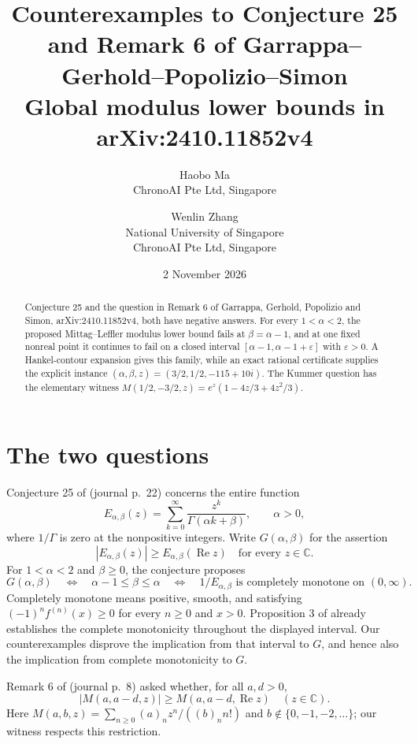 \documentclass[11pt]{article}
\title{Counterexamples to Conjecture 25 and Remark 6 of\newline
Garrappa--Gerhold--Popolizio--Simon\\[4pt]
\large Global modulus lower bounds in arXiv:2410.11852v4}
\author{Haobo Ma\\\small ChronoAI Pte Ltd, Singapore
\and Wenlin Zhang\\\small National University of Singapore\\\small ChronoAI Pte Ltd, Singapore}
\date{2 November 2026}
\newcommand{\Rea}{\operatorname{Re}}
\begin{document}
\maketitle
\begin{abstract}
Conjecture 25 and the question in Remark 6 of Garrappa, Gerhold,
Popolizio and Simon, arXiv:2410.11852v4, both have negative answers.
For every $1<\alpha<2$, the proposed Mittag--Leffler modulus lower
bound fails at $\beta=\alpha-1$, and at one fixed nonreal point it
continues to fail on a closed interval
$[\alpha-1,\alpha-1+\varepsilon]$ with $\varepsilon>0$.
A Hankel-contour expansion gives this family, while an exact rational
certificate supplies the explicit instance
$(\alpha,\beta,z)=(3/2,1/2,-115+10i)$.
The Kummer question has the elementary witness
$M(1/2,-3/2,z)=e^z(1-4z/3+4z^2/3)$.
\end{abstract}

\section{The two questions}
Conjecture 25 of \cite[p.~18]{ggps} (journal p.~22) concerns the entire function
\begin{equation}\label{eq:series}
 E_{\alpha,\beta}(z)=\sum_{k=0}^{\infty}
 \frac{z^k}{\Gamma(\alpha k+\beta)},\qquad \alpha>0,
\end{equation}
where $1/\Gamma$ is zero at the nonpositive integers.
Write $G(\alpha,\beta)$ for the assertion
\begin{equation}\label{eq:global}
 |E_{\alpha,\beta}(z)|\ge E_{\alpha,\beta}(\Rea z)
 \quad\text{for every }z\in\mathbb C.
\end{equation}
For $1<\alpha<2$ and $\beta\ge0$, the conjecture proposes
\begin{equation}\label{eq:conj}
 G(\alpha,\beta)\quad\Longleftrightarrow\quad
 \alpha-1\le\beta\le\alpha\quad\Longleftrightarrow\quad
 1/E_{\alpha,\beta}\text{ is completely monotone on }(0,\infty).
\end{equation}
Completely monotone means positive, smooth, and satisfying
$(-1)^n f^{(n)}(x)\ge0$ for every $n\ge0$ and $x>0$.
Proposition 3 of \cite{ggps} already establishes the complete
monotonicity throughout the displayed interval. Our counterexamples
disprove the implication from that interval to $G$, and hence also
the implication from complete monotonicity to $G$.

Remark 6 of \cite[p.~6]{ggps} (journal p.~8) asked whether, for all $a,d>0$,
\begin{equation}\label{eq:kummer-question}
 |M(a,a-d,z)|\ge M(a,a-d,\Rea z)\quad(z\in\mathbb C).
\end{equation}
Here $M(a,b,z)=\sum_{n\ge0}(a)_n z^n/((b)_n n!)$ and
$b\notin\{0,-1,-2,\ldots\}$; our witness respects this restriction.
\end{document}
